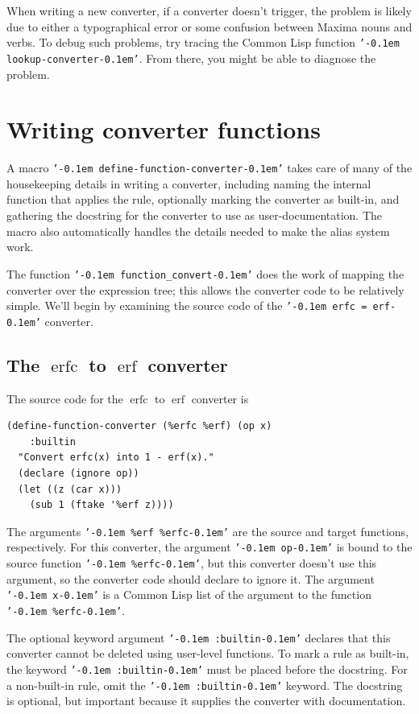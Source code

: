 \documentclass[12pt,fleqn]{extarticle}
\newcommand{\ttq}[1]{\texttt{'\kern-0.1em #1\kern-0.1em'}}
\newenvironment{maximabox}
  {\begin{tcolorbox}[
      breakable,
      enhanced,
      colback=white,
      colframe=black!8,
      boxrule=0pt,
      borderline west={2.2pt}{0pt}{black!25},
      arc=1pt,
      left=11pt,
      right=7pt,
      top=9pt,
      bottom=9pt,
      before skip=14pt,
      after skip=14pt
    ]}
  {\end{tcolorbox}}
\DeclareMathOperator{\erf}{erf}
\DeclareMathOperator{\erfc}{erfc}
\begin{document}
When writing a new converter, if a converter doesn't trigger, the problem is likely due to either
a typographical error or some confusion between Maxima nouns and verbs.  To debug such
problems, try tracing the Common Lisp function \ttq{lookup-converter}. From there, you 
might be able to diagnose the problem.

\section{Writing converter functions}
A macro \ttq{define-function-converter} takes care of many of the housekeeping 
details in writing a converter, including naming the internal function that applies the rule, 
optionally marking the converter as built-in, and gathering the docstring 
for the converter to use as user-documentation. The macro also automatically handles 
the details needed to make the alias system work. 

The function \ttq{function\_convert} does the work of mapping
the converter over the expression tree; this allows the converter code to be relatively simple.
We'll begin by examining the source code of the \ttq{erfc = erf} converter.

\subsection{The $\erfc$ to $\erf$ converter}

 The source code for the $\erfc$ to $\erf$ converter is 
\begin{maximabox}
\begin{verbatim}
(define-function-converter (%erfc %erf) (op x)
    :builtin
  "Convert erfc(x) into 1 - erf(x)."
  (declare (ignore op))
  (let ((z (car x)))
    (sub 1 (ftake '%erf z))))
\end{verbatim}
\end{maximabox}
The arguments \ttq{\%erf \%erfc} are the source and target functions, 
respectively.  For this converter, the argument \ttq{op} is bound to the source
function \ttq{\%erfc}, but  this converter doesn't use this argument, so the
converter code should declare to ignore it.  The argument \ttq{x} is
a Common Lisp list of the argument to the function \ttq{\%erfc}.

The optional keyword argument  \ttq{:builtin} declares that this converter cannot be
deleted using user-level functions. To mark a rule as built-in, the keyword \ttq{:builtin}  must be placed before the docstring. For a non-built-in rule,  omit the  \ttq{:builtin} keyword.
The docstring is optional, but important because it supplies the converter with documentation. 
\end{document}
